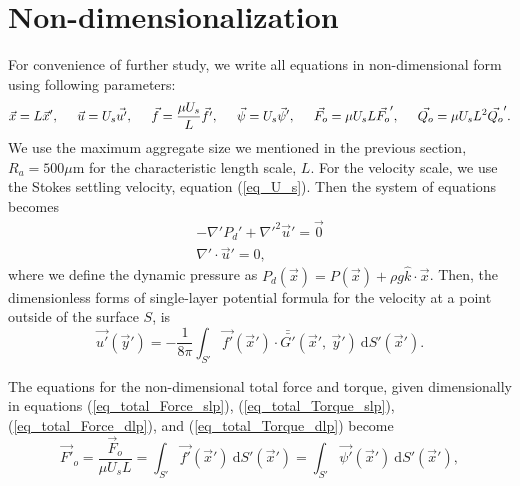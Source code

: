 \section{Non-dimensionalization}
For convenience of further study, we write all equations in non-dimensional form using following parameters:
\begin{equation}
\vec{x} = L\vec{x}', 
 \hspace{0.5cm} 
 \vec{u} = U_s \vec{u'},
 \hspace{0.5cm}
  \vec{f} = \frac{\mu U_s}{L} \vec{f'},
  \hspace{0.5cm}
  \vec{\psi} = U_s \vec{\psi}',
  \hspace{0.5cm}
  \vec{F_o} = \mu U_s L \vec{F_o}',
  \hspace{0.5cm}
  \vec{Q_o} = \mu U_s L^2 \vec{Q_o}'.
\label{eq_nonD}
\end{equation}
We use the maximum aggregate size we mentioned in the previous section, $R_a = 500 \mu$m for the characteristic length scale, $L$. For the velocity scale, we use the Stokes settling velocity, equation (\ref{eq_U_s}). 
Then the system of equations becomes
\begin{align}
    -\nabla' P_d' +  \nabla'^2 \vec{u}'  = \vec{0}
	\label{eq_momentum_noD}
	\\
    \nabla' \cdot \vec{u}' = 0,
	\label{eq_conti_noD}
\end{align}
where we define the dynamic pressure as 
$P_d(\vec{x}) =  P(\vec{x}) + \rho g \hat{k} \cdot \vec{x}$.
Then, the dimensionless forms of single-layer potential formula for the velocity at a point outside of the surface $S$, is 
\begin{equation}
    \vec{u'}(\vec{y}') =
	- \frac{1}{8 \pi}
	\int_{S'}  \vec{f'}(\vec{x}') \cdot \bar{\bar{G'}}(\vec{x}', \ \vec{y}') \ \text{d}S'(\vec{x}').
    \label{eq_single_nonD}
\end{equation}
\par
The equations for the non-dimensional total force and torque, given dimensionally in equations (\ref{eq_total_Force_slp}),  (\ref{eq_total_Torque_slp}),  (\ref{eq_total_Force_dlp}), and (\ref{eq_total_Torque_dlp})
become
\begin{equation}
 \vec{F'}_o = \frac{\vec{F}_o}{\mu U_s L} =
  \int_{S'} \vec{f'}(\vec{x}') \  \text{d}S'(\vec{x}')
 =\int_{S'}  \vec{\psi'}( \vec{x}') \ \text{d}S'(\vec{x}'),
 \label{eq_total_Force_noD}
 \end{equation} 
